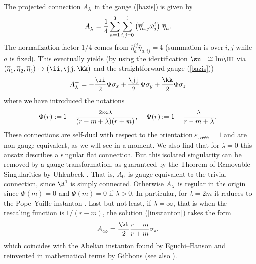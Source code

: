 \documentclass[a4paper,12pt,draft]{article}
\begin{document}
The projected connection $A^-_\lambda$ in the gauge
(\ref{bazis}) is given by
\[A^-_\lambda ={1\over
4}\sum\limits_{a=1}^3\sum\limits_{i,j=0}^3\left(\overline{\eta}^i_{a,j}
\tilde{\omega}^i_j\right)\:\overline{\eta}_a.\]
The normalization factor $1/4$ comes from
$\overline{\eta}_a^{ij}\overline{\eta}_{a, ij}=4$ (summation is over
$i,j$ while $a$ is fixed). This eventually yields (by using the
identification $\su^-\cong{\rm Im}\HH$ via $(\overline{\eta}_1,
\overline{\eta}_2, \overline{\eta}_3)\mapsto (\ii ,\jj ,\kk )$ and the
straightforward gauge (\ref{bazis}))
\begin{equation}
A^-_\lambda =-{\ii\over 2}\Psi\sigma_x+
{\jj\over 2}\Psi\sigma_y +{\kk\over 2} \Phi\sigma_z 
\label{insztanton}
\end{equation}
where we have introduced the notations
\begin{equation}
\Phi (r):=1-{2m\lambda\over (r-m+\lambda )(r+m)},\:\:\:\:\:\Psi
(r):=1-{\lambda\over r-m+\lambda } .
\label{megoldas}
\end{equation}
These connections are self-dual with respect to the orientation
$\varepsilon_{\tau r\Theta\phi}=1$ and are non gauge-equivalent, 
as we will see in a moment. We also find that for $\lambda =0$ this
ansatz describes a singular flat connection. But this
isolated singularity can be removed by a gauge transformation, as
guaranteed by the Theorem of Removable Singularities by Uhlenbeck
\cite{uhl}. That is, $A_0^-$ is gauge-equivalent to
the trivial connection, since  $\R^4$ is simply connected. Otherwise
$A^-_\lambda$ is regular in the origin since $\Phi (m)=0$ and
$\Psi (m)=0$ if $\lambda >0$. In particular, for $\lambda =2m$ it reduces
to the Pope--Yuille instanton \cite{pop-yui}. Last but not least, if
$\lambda =\infty$, that is when the rescaling function is $1/(r-m)$, the
solution (\ref{insztanton}) takes the form
\[A^-_\infty ={\kk\over 2}{r-m\over r+m}\sigma_z,\]
which coincides with the Abelian instanton found
by Eguchi--Hanson \cite{egu-han} and reinvented in
mathematical terms by Gibbons \cite{gib} (see also \cite{pop}).
\end{document}

